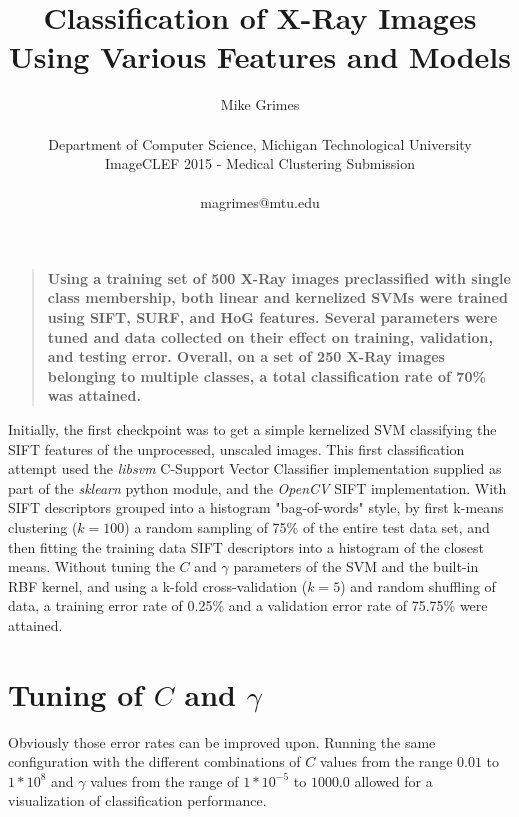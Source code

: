 \documentclass[12pt]{article}
\title{Classification of X-Ray Images Using Various Features and Models}
\author
{Mike Grimes\\
\\
\normalsize{Department of Computer Science, Michigan Technological University}\\
\normalsize{ImageCLEF 2015 - Medical Clustering Submission}\\
\\
\normalsize{magrimes@mtu.edu}
}
\date{}
\newenvironment{sciabstract}{%
\begin{quote} \bf}
{\end{quote}}
\begin{document}
 


\baselineskip24pt


\maketitle 


\begin{sciabstract}
Using a training set of 500 X-Ray images preclassified with single class membership,
both linear and kernelized SVMs were trained using SIFT, SURF, and HoG features. Several
parameters were tuned and data collected on their effect on training, validation, and
testing error. Overall, on a set of 250 X-Ray images belonging to multiple classes,
a total classification rate of 70\% was attained.
\end{sciabstract}

Initially, the first checkpoint was to get a simple kernelized
SVM classifying the SIFT features of the unprocessed, unscaled
images. This first classification attempt used the {\it libsvm}
C-Support Vector Classifier implementation supplied as part of
the {\it sklearn} python module, and the {\it OpenCV} SIFT implementation.
With SIFT descriptors grouped into a histogram "bag-of-words" style,
by first k-means clustering ($k = 100$) a random sampling of 75\% of
the entire test data set, and then fitting the training data
SIFT descriptors into a histogram of the closest means.
Without tuning the $C$ and $\gamma$ parameters of the SVM and the
built-in RBF kernel, and using a k-fold cross-validation ($k = 5$)
and random shuffling of data, a training error rate of 0.25\% and
a validation error rate of 75.75\% were attained.

\section*{Tuning of $C$ and $\gamma$}

Obviously those error rates can be improved upon. Running the same
configuration with the different combinations of $C$ values from the range
$0.01$ to $1 * 10^{8}$ and $\gamma$ values from the range of $1 * 10^{-5}$
to $1000.0$ allowed for a visualization of classification performance.
\vspace{0.2in}
\end{document}
